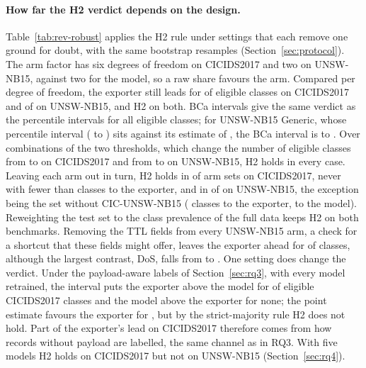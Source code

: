 \documentclass[pdflatex,sn-mathphys-num]{sn-jnl}
\newcommand{\cicids}{CICIDS2017}
\theoremstyle{thmstyleone}%
\theoremstyle{thmstylethree}%
\begin{document}


\paragraph{How far the H2 verdict depends on the design.} Table~\ref{tab:rev-robust} applies the H2 rule under settings that each remove one ground for doubt, with the same bootstrap resamples (Section~\ref{sec:protocol}). The arm factor has six degrees of freedom on \cicids{} and two on UNSW-NB15, against two for the model, so a raw share favours the arm. Compared per degree of freedom, the exporter still leads for \RevPerdfAboveCic{} of \RevEligCic{} eligible classes on \cicids{} and \RevPerdfAboveUnsw{} of \RevEligUnsw{} on UNSW-NB15, and H2 \RevPerdfHtwoCic{} on both. BCa intervals give the same verdict as the percentile intervals for all \RevBcaN{} eligible classes; for UNSW-NB15 Generic, whose percentile interval (\RevBcaGenericPctLo{} to \RevBcaGenericPctHi{}) sits against its estimate of \RevBcaGenericShare{}, the BCa interval is \RevBcaGenericLo{} to \RevBcaGenericHi{}. Over \RevThrSettings{} combinations of the two thresholds, which change the number of eligible classes from \RevThrEligMinCic{} to \RevThrEligMaxCic{} on \cicids{} and from \RevThrEligMinUnsw{} to \RevThrEligMaxUnsw{} on UNSW-NB15, H2 holds in every case. Leaving each arm out in turn, H2 holds in \RevSubHoldCic{} of \RevSubNCic{} arm sets on \cicids{}, never with fewer than \RevSubAboveMinCic{} classes to the exporter, and in \RevSubHoldUnsw{} of \RevSubNUnsw{} on UNSW-NB15, the exception being the set without CIC-UNSW-NB15 (\RevSubUnswNoCicAbove{} classes to the exporter, \RevSubUnswNoCicModel{} to the model). Reweighting the test set to the class prevalence of the full data keeps H2 on both benchmarks. Removing the TTL fields from every UNSW-NB15 arm, a check for a shortcut that these fields might offer, leaves the exporter ahead for \RevTtlAbove{} of \RevTtlElig{} classes, although the largest contrast, DoS, falls from \RevTtlDosWith{} to \RevTtlDosWithout{}. One setting does change the verdict. Under the payload-aware labels of Section~\ref{sec:rq3}, with every model retrained, the interval puts the exporter above the model for \RevPayAbove{} of \RevPayElig{} eligible \cicids{} classes and the model above the exporter for none; the point estimate favours the exporter for \RevPayPointAbove{}, but by the strict-majority rule H2 does not hold. Part of the exporter's lead on \cicids{} therefore comes from how records without payload are labelled, the same channel as in RQ3. With five models H2 holds on \cicids{} but not on UNSW-NB15 (Section~\ref{sec:rq4}).
\end{document}
